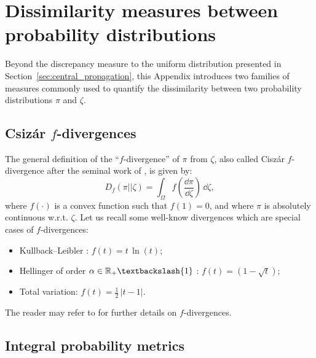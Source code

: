 \cleardoublepage
\chapter{Dissimilarity measures between probability distributions}
\label{apx:B}

Beyond the discrepancy measure to the uniform distribution presented in Section~\ref{sec:central_propagation}, this Appendix introduces two families of measures commonly used to quantify the dissimilarity between two probability distributions $\pi$ and $\zeta$.  


\section*{Csiz\'{a}r $f$-divergences}

The general definition of the ``$f$-divergence'' of $\pi$ from $\zeta$, also called Cisz\'{a}r $f$-divergence after the seminal work of \citet{csiszar_1964}, is given by: 
\begin{equation}
    D_{f}\left(\pi || \zeta\right) = \int_{\Omega} f\left(\frac{\dd \pi}{\dd \zeta}\right) \, \dd \zeta, 
\end{equation}
where $f(\cdot)$ is a convex function such that $f(1)=0$, and where $\pi$ is absolutely continuous w.r.t. $\zeta$. 
Let us recall some well-know divergences which are special cases of $f$-divergences:
\begin{itemize}
    \item Kullback–Leibler \citep{kullback_1951}: $f(t)=t \, \ln(t)$;
    \item Hellinger of order $\alpha \in \R_+ \textbackslash \{1\}$ \citep{jeffreys_1946}: $f(t)=(1 - \sqrt{t})$;
    \item Total variation: $f(t)= \frac12 \, |t-1|$.
\end{itemize} 
The reader may refer to \citet{basu_2011} for further details on $f$-divergences.


\section*{Integral probability metrics}

